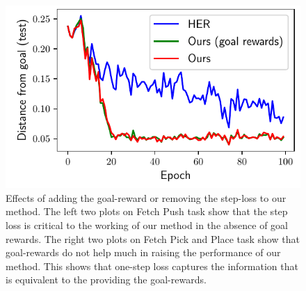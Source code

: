 \begin{figure}
  \includegraphics[width=\frac\columnwidth]{media/res/ablate-ours-with-goal-reward/FetchPickAndPlace-dqstepoch-test/ag_g_dist.pdf}%
  \caption{
    Effects of adding the goal-reward or removing the step-loss to our method.
    The left two plots on Fetch Push task show that the step loss is critical to the working of our
    method in the absence of goal rewards.
    The right two plots on Fetch Pick and Place task show that goal-rewards do not help much in raising the
    performance of our method. This shows that one-step loss captures the
    information that is equivalent to the providing the goal-rewards.}
  \label{fig:with-and-without-step-loss}%
\end{figure}%
% 

